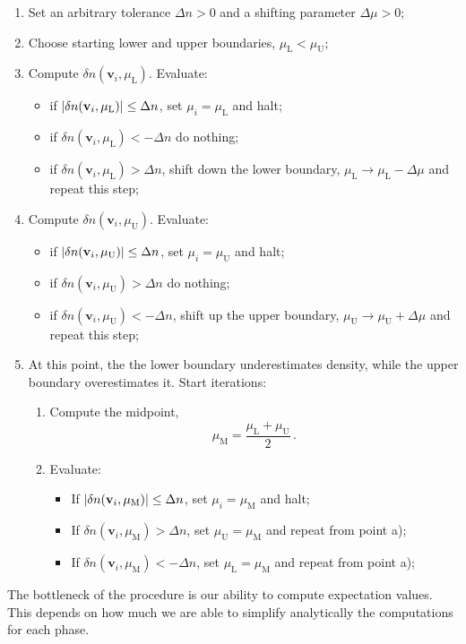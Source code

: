 \begin{enumerate}
	\item Set an arbitrary tolerance $\Delta n > 0$ and a shifting parameter $\Delta \mu > 0$;
	\item Choose starting lower and upper boundaries, $\mu_\mathrm{L}<\mu_\mathrm{U}$;
	\item Compute $\delta n(\mathbf{v}_i,\mu_\mathrm{L})$. Evaluate: 
	\begin{itemize}
		\item if $\abs{\delta n(\mathbf{v}_i,\mu_\mathrm{L})} \le \Delta n$, set $\mu_i = \mu_\mathrm{L}$ and halt;
		\item if $\delta n(\mathbf{v}_i,\mu_\mathrm{L}) < -\Delta n$ do nothing;
		\item if $\delta n(\mathbf{v}_i,\mu_\mathrm{L}) > \Delta n$, shift down the lower boundary, $\mu_\mathrm{L} \to \mu_\mathrm{L} - \Delta \mu$ and repeat this step;
	\end{itemize}
	\item Compute $\delta n(\mathbf{v}_i,\mu_\mathrm{U})$. Evaluate: 
	\begin{itemize}
		\item if $\abs{\delta n(\mathbf{v}_i,\mu_\mathrm{U})} \le \Delta n$, set $\mu_i = \mu_\mathrm{U}$ and halt;
		\item if $\delta n(\mathbf{v}_i,\mu_\mathrm{U}) > \Delta n$ do nothing;
		\item if $\delta n(\mathbf{v}_i,\mu_\mathrm{U}) < - \Delta n$, shift up the upper boundary, $\mu_\mathrm{U} \to \mu_\mathrm{U} + \Delta \mu$ and repeat this step;
	\end{itemize}
	\item At this point, the the lower boundary underestimates density, while the upper boundary overestimates it. Start iterations:
	\begin{enumerate}
		\item Compute the midpoint,
		\[
			\mu_\mathrm{M} = \frac{\mu_\mathrm{L} + \mu_\mathrm{U}}{2} \, .
		\]
		\item Evaluate:
		\begin{itemize}
			\item If $\abs{\delta n(\mathbf{v}_i,\mu_\mathrm{M})} \le \Delta n$, set $\mu_i = \mu_\mathrm{M}$ and halt;
			\item If $\delta n(\mathbf{v}_i,\mu_\mathrm{M}) > \Delta n$, set $\mu_\mathrm{U} = \mu_\mathrm{M}$ and repeat from point a);
			\item If $\delta n(\mathbf{v}_i,\mu_\mathrm{M}) < -\Delta n$, set $\mu_\mathrm{L} = \mu_\mathrm{M}$ and repeat from point a);
		\end{itemize}
	\end{enumerate}
\end{enumerate}
The bottleneck of the procedure is our ability to compute expectation values. This depends on how much we are able to simplify analytically the computations for each phase.

